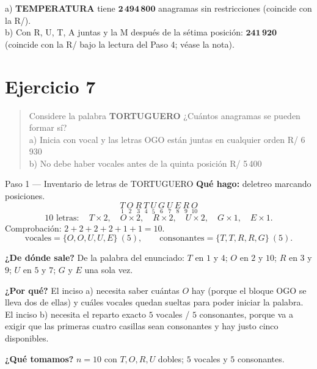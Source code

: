 \documentclass[11pt]{article}
\begin{document}
\begin{resp}
a) \textbf{TEMPERATURA} tiene $\mathbf{2\,494\,800}$ anagramas sin restricciones (coincide con la R/).\\
b) Con R, U, T, A juntas y la M después de la sétima posición: $\mathbf{241\,920}$ (coincide con la R/ bajo
la lectura del Paso 4; véase la nota).
\end{resp}

\section*{Ejercicio 7}

\begin{quote}
Considere la palabra \textbf{TORTUGUERO} ¿Cuántos anagramas se pueden formar sí?\\
a) Inicia con vocal y las letras OGO están juntas en cualquier orden \hfill R/ 6\,930\\
b) No debe haber vocales antes de la quinta posición \hfill R/ 5\,400
\end{quote}

\begin{paso}{Paso 1 --- Inventario de letras de TORTUGUERO}
\textbf{Qué hago:} deletreo marcando posiciones.
\[
\underset{1}{T}\ \underset{2}{O}\ \underset{3}{R}\ \underset{4}{T}\ \underset{5}{U}\ \underset{6}{G}\
\underset{7}{U}\ \underset{8}{E}\ \underset{9}{R}\ \underset{10}{O}
\]
\[
10 \text{ letras}:\quad T\times 2,\quad O\times 2,\quad R\times 2,\quad U\times 2,\quad
G\times 1,\quad E\times 1 .
\]
Comprobación: $2+2+2+2+1+1=10$. \checkmark
\[
\text{vocales} = \{O,O,U,U,E\}\ (5),\qquad \text{consonantes} = \{T,T,R,R,G\}\ (5).
\]

\textbf{¿De dónde sale?} De la palabra del enunciado: $T$ en $1$ y $4$; $O$ en $2$ y $10$; $R$ en $3$ y $9$;
$U$ en $5$ y $7$; $G$ y $E$ una sola vez.

\textbf{¿Por qué?} El inciso a) necesita saber cuántas $O$ hay (porque el bloque OGO se lleva dos de ellas) y
cuáles vocales quedan sueltas para poder iniciar la palabra. El inciso b) necesita el reparto exacto
$5$ vocales / $5$ consonantes, porque va a exigir que las primeras cuatro casillas sean consonantes y hay
justo cinco disponibles.

\textbf{¿Qué tomamos?} $n=10$ con $T,O,R,U$ dobles; $5$ vocales y $5$ consonantes.
\end{paso}
\end{document}
